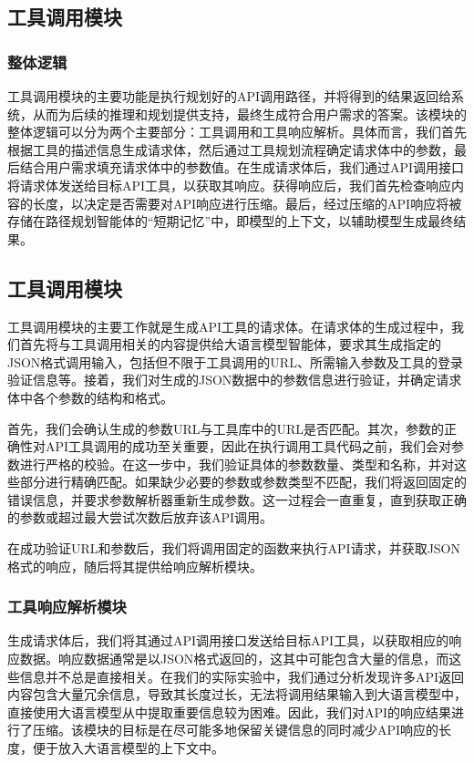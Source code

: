 \subsection{工具调用模块}
\label{sec:real_tool_simulation}

\subsubsection{整体逻辑}

工具调用模块的主要功能是执行规划好的API调用路径，并将得到的结果返回给系统，从而为后续的推理和规划提供支持，最终生成符合用户需求的答案。该模块的整体逻辑可以分为两个主要部分：工具调用和工具响应解析。具体而言，我们首先根据工具的描述信息生成请求体，然后通过工具规划流程确定请求体中的参数，最后结合用户需求填充请求体中的参数值。在生成请求体后，我们通过API调用接口将请求体发送给目标API工具，以获取其响应。获得响应后，我们首先检查响应内容的长度，以决定是否需要对API响应进行压缩。最后，经过压缩的API响应将被存储在路径规划智能体的“短期记忆”中，即模型的上下文，以辅助模型生成最终结果。

\subsection{工具调用模块}

工具调用模块的主要工作就是生成API工具的请求体。在请求体的生成过程中，我们首先将与工具调用相关的内容提供给大语言模型智能体，要求其生成指定的JSON格式调用输入，包括但不限于工具调用的URL、所需输入参数及工具的登录验证信息等。接着，我们对生成的JSON数据中的参数信息进行验证，并确定请求体中各个参数的结构和格式。

首先，我们会确认生成的参数URL与工具库中的URL是否匹配。其次，参数的正确性对API工具调用的成功至关重要，因此在执行调用工具代码之前，我们会对参数进行严格的校验。在这一步中，我们验证具体的参数数量、类型和名称，并对这些部分进行精确匹配。如果缺少必要的参数或参数类型不匹配，我们将返回固定的错误信息，并要求参数解析器重新生成参数。这一过程会一直重复，直到获取正确的参数或超过最大尝试次数后放弃该API调用。

在成功验证URL和参数后，我们将调用固定的函数来执行API请求，并获取JSON格式的响应，随后将其提供给响应解析模块。

\subsubsection{工具响应解析模块}

生成请求体后，我们将其通过API调用接口发送给目标API工具，以获取相应的响应数据。响应数据通常是以JSON格式返回的，这其中可能包含大量的信息，而这些信息并不总是直接相关。在我们的实际实验中，我们通过分析发现许多API返回内容包含大量冗余信息，导致其长度过长，无法将调用结果输入到大语言模型中，直接使用大语言模型从中提取重要信息较为困难。因此，我们对API的响应结果进行了压缩。该模块的目标是在尽可能多地保留关键信息的同时减少API响应的长度，便于放入大语言模型的上下文中。

